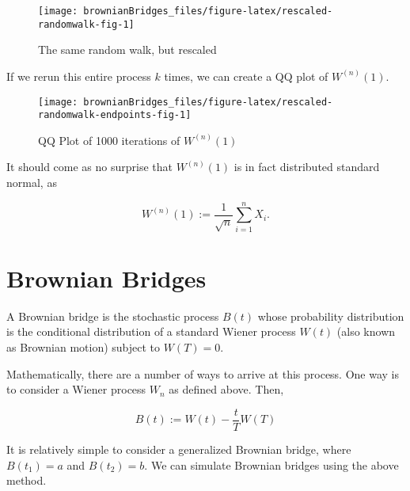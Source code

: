 \documentclass[
]{article}
\begin{document}
\begin{figure}
\texttt{[image: brownianBridges\_files/figure-latex/rescaled-randomwalk-fig-1]} \caption{The same random walk, but rescaled}\label{fig:rescaled-randomwalk-fig}
\end{figure}

If we rerun this entire process \(k\) times, we can create a QQ plot of \(W^{(n)}(1)\).

\begin{figure}
\texttt{[image: brownianBridges\_files/figure-latex/rescaled-randomwalk-endpoints-fig-1]} \caption{QQ Plot of 1000 iterations of $W^{(n)}(1)$}\label{fig:rescaled-randomwalk-endpoints-fig}
\end{figure}

It should come as no surprise that \(W^{(n)}(1)\) is in fact distributed standard normal, as

\[
  W^{(n)}(1) := \frac{1}{\sqrt{n}} \sum_{i=1}^{n} X_i.
\]

\hypertarget{brownian-bridges}{%
\section{Brownian Bridges}\label{brownian-bridges}}

A Brownian bridge is the stochastic process \(B(t)\) whose probability distribution is the conditional distribution of a standard Wiener process \(W(t)\) (also known as Brownian motion) subject to \(W(T) = 0\).

Mathematically, there are a number of ways to arrive at this process. One way is to consider a Wiener process \(W_n\) as defined above. Then,

\[
  B(t) := W(t) - \frac{t}{T}W(T)
\]

It is relatively simple to consider a generalized Brownian bridge, where \(B(t_1) = a\) and \(B(t_2) = b\). We can simulate Brownian bridges using the above method.
\end{document}
